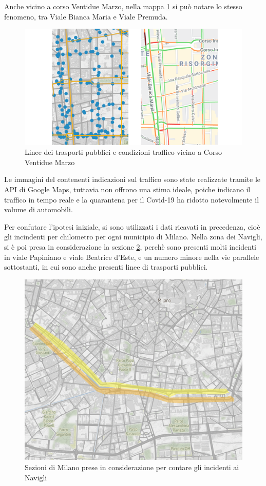 \documentclass[a4paper,12pt]{report}
\begin{document}
Anche vicino a corso Ventidue Marzo, nella mappa \ref{fig:22-marzo} si può 
notare lo stesso fenomeno, tra Viale Bianca Maria e Viale Premuda.

\begin{figure}
    \includegraphics[width=\linewidth]{../src/atm/22_marzo.png}
    \caption{Linee dei trasporti pubblici e condizioni traffico vicino a Corso Ventidue Marzo}
    \label{fig:22-marzo}
\end{figure}

Le immagini del contenenti indicazioni sul traffico sono state realizzate tramite le API di 
Google Maps, tuttavia non offrono una stima ideale, poiche indicano il traffico in tempo reale e 
la quarantena per il Covid-19 ha ridotto notevolmente il volume di automobili.

Per confutare l'ipotesi iniziale, si sono utilizzati i dati ricavati in precedenza, 
cioè gli incindenti per chilometro per ogni municipio di Milano. 
Nella zona dei Navigli, si è poi presa in considerazione la sezione \ref{fig:zona-navigli-rect}, 
perchè sono presenti molti incidenti in viale Papiniano e viale Beatrice d'Este, 
e un numero minore nella vie parallele sottostanti, in cui sono anche presenti 
linee di trasporti pubblici.

\begin{figure}
    \hfill\includegraphics[width=0.7\linewidth]{../src/atm/zona_navigli_rect.png}\hspace*{\fill}
    \caption{Sezioni di Milano prese in considerazione per contare gli incidenti ai Navigli}
    \label{fig:zona-navigli-rect}
\end{figure}
\end{document}
